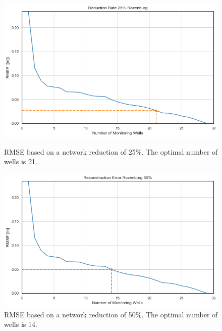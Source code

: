     \begin{figure}[htbp]
    \begin{minipage}{0.48\textwidth}
        \centering %
        \includegraphics[width=\linewidth]{frontmatter/Rozenburg-fig/new25.png}
        \caption{RMSE based on a network reduction of 25\%. The optimal number of wells is 21.}
        \label{roz25}
    \end{minipage}
    \begin{minipage}{0.48\textwidth}
        \centering %
        \includegraphics[width=\linewidth]{frontmatter/Rozenburg-fig/new50.png}
        \caption{RMSE based on a network reduction of 50\%. The optimal number of wells is 14.}
        \label{roz50}
    \end{minipage}
\end{figure}
\noindent
